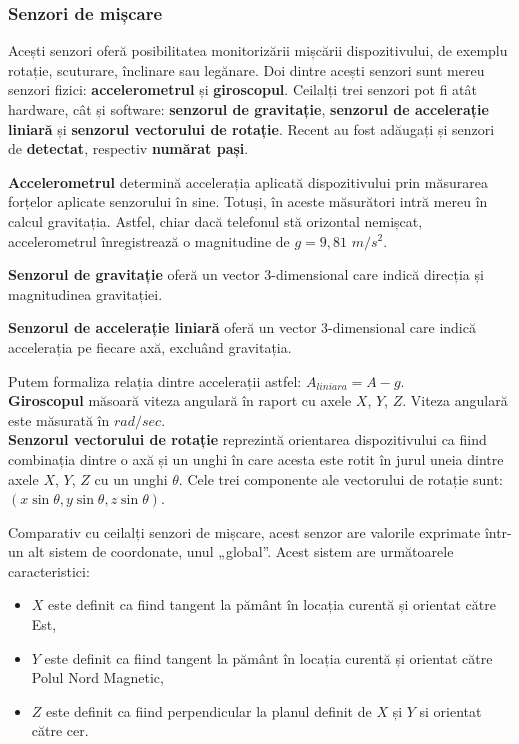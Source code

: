 \documentclass[12pt,a4paper]{article}
\begin{document}
\subsubsection{Senzori de mișcare}
Acești senzori oferă posibilitatea monitorizării mișcării dispozitivului, de exemplu rotație, scuturare, înclinare sau legănare. Doi dintre acești senzori sunt mereu senzori fizici: \textbf{accelerometrul} și \textbf{giroscopul}. Ceilalți trei senzori pot fi atât hardware, cât și software: \textbf{senzorul de gravitație}, \textbf{senzorul de accelerație liniară} și \textbf{senzorul vectorului de rotație}. Recent au fost adăugați și senzori de \textbf{detectat}, respectiv \textbf{numărat pași}.

	\textbf{Accelerometrul} determină accelerația aplicată dispozitivului prin măsurarea forțelor aplicate senzorului în sine. Totuși, în aceste măsurători intră mereu în calcul gravitația. Astfel, chiar dacă telefonul stă orizontal nemișcat, accelerometrul înregistrează o magnitudine de $g = 9,81$ $m/s^{2}$.

	\textbf{Senzorul de gravitație} oferă un vector 3-dimensional care indică direcția și magnitudinea gravitației.

	\textbf{Senzorul de accelerație liniară} oferă un vector 3-dimensional care indică accelerația pe fiecare axă, excluând gravitația.

	Putem formaliza relația dintre accelerații astfel:
	$A_{liniara} = A - g$.\\

	\textbf{Giroscopul} măsoară viteza angulară în raport cu axele $X$, $Y$, $Z$. Viteza angulară este măsurată în $rad/sec$.\\

	\textbf{Senzorul vectorului de rotație} reprezintă orientarea dispozitivului ca fiind combinația dintre o axă și un unghi în care acesta este rotit în jurul uneia dintre axele $X$, $Y$, $Z$ cu un unghi $\theta$. Cele trei componente ale vectorului de rotație sunt: $(x \sin{\theta}, y \sin{\theta}, z \sin{\theta})$. 
	
	Comparativ cu ceilalți senzori de mișcare, acest senzor are valorile exprimate într-un alt sistem de coordonate, unul „global”.
	Acest sistem are următoarele caracteristici:
	\begin{itemize}
	\item $X$ este definit ca fiind tangent la pământ în locația curentă și orientat către Est,
	\item $Y$ este definit ca fiind tangent la pământ în locația curentă și orientat către Polul Nord Magnetic,
	\item $Z$ este definit ca fiind perpendicular la planul definit de $X$ și $Y$ si orientat către cer.
	\end{itemize}
\end{document}
